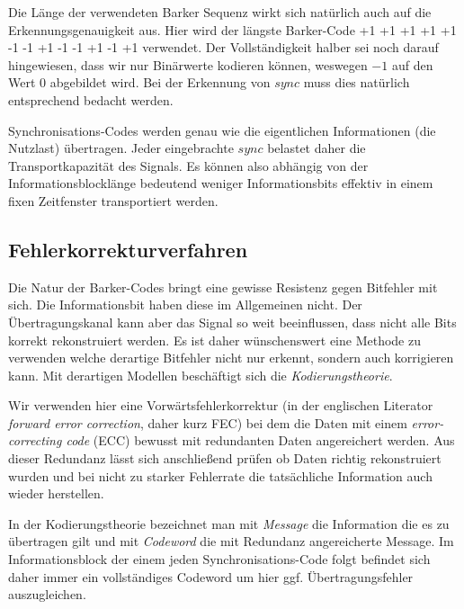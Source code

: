 Die Länge der verwendeten Barker Sequenz wirkt sich natürlich auch auf die Erkennungsgenauigkeit aus. Hier wird der längste Barker-Code \textsf{+1 +1 +1 +1 +1 -1 -1 +1 -1 -1 +1 -1 +1} verwendet. Der Vollständigkeit halber sei noch darauf hingewiesen, dass wir nur Binärwerte kodieren können, weswegen $-1$ auf den Wert $0$ abgebildet wird. Bei der Erkennung von $sync$ muss dies natürlich entsprechend bedacht werden.

Synchronisations-Codes werden genau wie die eigentlichen Informationen (die \glqq{}Nutzlast\grqq{}) übertragen. Jeder eingebrachte $sync$ belastet daher die Transportkapazität des Signals. Es können also abhängig von der Informationsblocklänge bedeutend weniger Informationsbits effektiv in einem fixen Zeitfenster transportiert werden. 


\subsection{Fehlerkorrekturverfahren} 
\label{sec:errorcorrection}

Die Natur der Barker-Codes bringt eine gewisse Resistenz gegen Bitfehler mit sich. Die Informationsbit haben diese im Allgemeinen nicht. Der Übertragungskanal kann aber das Signal so weit beeinflussen, dass nicht alle Bits korrekt rekonstruiert werden. Es ist daher wünschenswert eine Methode zu verwenden welche derartige Bitfehler nicht nur erkennt, sondern auch korrigieren kann. Mit derartigen Modellen beschäftigt sich die \textit{Kodierungstheorie}.

Wir verwenden hier eine Vorwärtsfehlerkorrektur (in der englischen Literator \textit{forward error correction}, daher kurz FEC) bei dem die Daten mit einem \textit{error-correcting code}  (ECC) bewusst mit redundanten Daten angereichert werden. Aus dieser Redundanz lässt sich anschließend prüfen ob Daten richtig rekonstruiert wurden und bei nicht zu starker Fehlerrate die tatsächliche Information auch wieder herstellen. 

In der Kodierungstheorie bezeichnet man mit \textit{Message} die Information die es zu übertragen gilt und mit \textit{Codeword} die mit Redundanz angereicherte Message. Im Informationsblock der einem jeden Synchronisations-Code folgt befindet sich daher immer ein vollständiges Codeword um hier ggf. Übertragungsfehler auszugleichen. 

